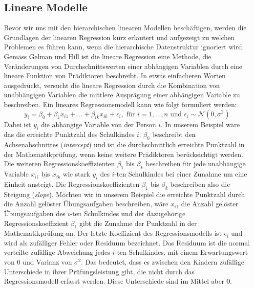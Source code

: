 \documentclass[12pt]{article}\usepackage[]{graphicx}\usepackage[]{color}
\numberwithin{equation}{section}
\begin{document}
\subsection{Lineare Modelle} \label{section:linear_model}
Bevor wir uns mit den hierarchischen linearen Modellen beschäftigen, werden die Grundlagen der linearen Regression kurz erläutert und aufgezeigt zu welchen Problemen es führen kann, wenn die hierarchische Datenstruktur ignoriert wird. Gemäss Gelman und Hill \citeyearpar{andrew_data} ist die lineare Regression eine Methode, die Veränderungen von Durchschnittswerten einer abhängigen Variablen durch eine lineare Funktion von Prädiktoren beschreibt. In etwas einfacheren Worten ausgedrückt, versucht die lineare Regression durch die Kombination von unabhängigen Variablen die mittlere Ausprägung einer abhängigen Variable zu beschreiben. Ein lineares Regressionsmodell kann wie folgt formuliert werden:
\begin{equation} \label{eq:ols_model}
y_{i} = \beta_{0} + \beta_{1}x_{i1} + \dots + \beta_{ik}x_{ik} + \epsilon_{i}, \text{ für } i = 1, \dots, n \text{ und } \epsilon_{i} \sim \mathcal{N}(0,\sigma^{2})
\end{equation}
Dabei ist $y_{i}$ die abhängige Variable von der Person $i$. In unserem Beispiel wäre das die erreichte Punktzahl des Schulkindes $i$. $\beta_0$ beschreibt den Achsenabschnittes (\textit{intercept}) und ist die durchschnittlich erreichte Punktzahl in der Mathematikprüfung, wenn keine weitere Prädiktoren berücksichtigt werden. Die weiteren Regressionskoeffizienten $\beta_{1}$ bis $\beta_{k}$ beschreiben für jede unabhängige Variable $x_{i1}$ bis $x_{ik}$ wie stark $y_{i}$ des $i$-ten Schulkindes bei einer Zunahme um eine Einheit ansteigt. Die Regressionskoeffizienten $\beta_{1}$ bis $\beta_{k}$ beschreiben also die Steigung (\textit{slope}). Möchten wir in unserem Beispiel die erreichte Punktzahl durch die Anzahl gelöster Übungsaufgaben beschreiben, wäre $x_{i1}$ die Anzahl gelöster Übungsaufgaben des $i$-ten Schulkindes und der dazugehörige Regressionskoeffizient $\beta_{1}$ gibt die Zunahme der Punktzahl in der Mathematikprüfung an. Der letzte Koeffizient des Regressionsmodells ist $\epsilon_{i}$ und wird als zufälliger Fehler oder Residuum bezeichnet. Das Residuum ist die normal verteilte zufällige Abweichung jedes $i$-ten Schulkindes, mit einem Erwartungswert von 0 und Varianz von $\sigma^{2}$. Das bedeutet, dass es zwischen den Kindern zufällige Unterschiede in ihrer Prüfungsleistung gibt, die nicht durch das Regressionsmodell erfasst werden. Diese Unterschiede sind im Mittel aber 0. 
\end{document}
